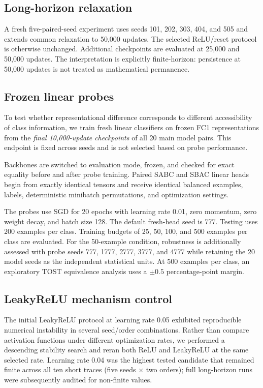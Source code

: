 \documentclass[11pt,a4paper]{article}
\begin{document}
\subsection{Long-horizon relaxation}
A fresh five-paired-seed experiment uses seeds 101, 202, 303, 404, and 505 and extends common relaxation to 50,000 updates. The selected ReLU/reset protocol is otherwise unchanged. Additional checkpoints are evaluated at 25,000 and 50,000 updates. The interpretation is explicitly finite-horizon: persistence at 50,000 updates is not treated as mathematical permanence.

\subsection{Frozen linear probes}
To test whether representational difference corresponds to different accessibility of class information, we train fresh linear classifiers on frozen FC1 representations from the \emph{final 10,000-update checkpoints} of all 20 main model pairs. This endpoint is fixed across seeds and is not selected based on probe performance.

Backbones are switched to evaluation mode, frozen, and checked for exact equality before and after probe training. Paired SABC and SBAC linear heads begin from exactly identical tensors and receive identical balanced examples, labels, deterministic minibatch permutations, and optimization settings.

The probes use SGD for 20 epochs with learning rate 0.01, zero momentum, zero weight decay, and batch size 128. The default fresh-head seed is 777. Testing uses 200 examples per class. Training budgets of 25, 50, 100, and 500 examples per class are evaluated. For the 50-example condition, robustness is additionally assessed with probe seeds 777, 1777, 2777, 3777, and 4777 while retaining the 20 model seeds as the independent statistical units. At 500 examples per class, an exploratory TOST equivalence analysis uses a $\pm0.5$ percentage-point margin.

\subsection{LeakyReLU mechanism control}
The initial LeakyReLU protocol at learning rate 0.05 exhibited reproducible numerical instability in several seed/order combinations. Rather than compare activation functions under different optimization rates, we performed a descending stability search and reran both ReLU and LeakyReLU at the same selected rate. Learning rate 0.04 was the highest tested candidate that remained finite across all ten short traces (five seeds $\times$ two orders); full long-horizon runs were subsequently audited for non-finite values.
\end{document}
